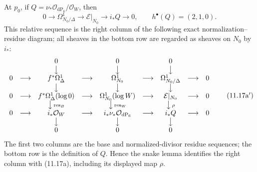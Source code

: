 \begin{remark}
At $p_0$, if
$Q=\nu_*\mathcal O_{\mathrm{dP}_6}/\mathcal O_W$, then
\[
 0\longrightarrow\Omega^1_{N_0/\Delta}\longrightarrow
 \mathcal E|_{N_0}\longrightarrow i_*Q\longrightarrow0,
 \qquad h^\bullet(Q)=(2,1,0).
\tag{11.17a}
\]
This relative sequence is the right column of the following exact
normalization--residue diagram; all sheaves in the bottom row are regarded as
sheaves on $N_0$ by $i_*$:
\[
\begin{array}{ccccccccc}
&&0&&0&&0&&\\
&&\big\downarrow&&\big\downarrow&&\big\downarrow&&\\
0&\longrightarrow&f^*\Omega^1_\Delta&\longrightarrow&\Omega^1_{N_0}
 &\longrightarrow&\Omega^1_{N_0/\Delta}&\longrightarrow&0\\
&&\big\downarrow&&\big\downarrow&&\big\downarrow&&\\
0&\longrightarrow&f^*\Omega^1_\Delta(\log0)&\longrightarrow&
 \Omega^1_{N_0}(\log W)&\longrightarrow&\mathcal E|_{N_0}
 &\longrightarrow&0\\
&&\big\downarrow\,{\scriptstyle\operatorname{res}_B}
&&\big\downarrow\,{\scriptstyle\operatorname{res}_W}
&&\big\downarrow\,{\scriptstyle\rho}&&\\
0&\longrightarrow&i_*\mathcal O_W&\longrightarrow&
 i_*\nu_*\mathcal O_{\mathrm{dP}_6}&\longrightarrow&i_*Q
 &\longrightarrow&0\\
&&\big\downarrow&&\big\downarrow&&\big\downarrow&&\\
&&0&&0&&0&&
\end{array}
\tag{11.17a$'$}
\]
The first two columns are the base and normalized-divisor residue sequences;
the bottom row is the definition of $Q$.  Hence the snake lemma identifies
the right column with (11.17a), including its displayed map $\rho$.


\end{remark}
